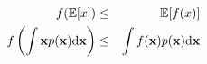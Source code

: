 \begin{eqnarray*}
f(\mathbb{E}[x]) &\le& \mathbb{E}[f(x)] \\
f\left(\int {\bf x}p({\bf x}){\rm d}{\bf x}\right) &\le& \int f({\bf x})p({\bf x}) {\rm d}{\bf x}
\end{eqnarray*}
